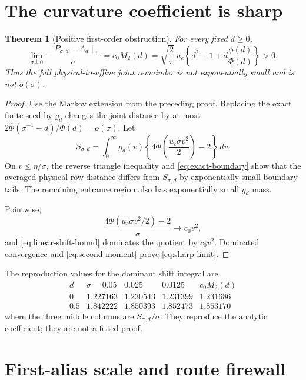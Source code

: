 \documentclass[11pt]{article}
\newtheorem{theorem}{Theorem}[section]
\theoremstyle{remark}
\begin{document}
\section{The curvature coefficient is sharp}

\begin{theorem}[Positive first-order obstruction]
\label{thm:sharp-coefficient}
For every fixed $d\ge0$,
\begin{equation}\label{eq:sharp-limit}
 \boxed{
 \lim_{\sigma\downarrow0}
 \frac{\|P_{\sigma,d}-A_d\|_1}{\sigma}
 =c_0M_2(d)
 =\sqrt{\frac2\pi}\,u_c
 \left\{d^2+1+d\frac{\phi(d)}{\Phi(d)}\right\}>0.}
\end{equation}
Thus the full physical-to-affine joint remainder is not exponentially small
and is not $o(\sigma)$.
\end{theorem}

\begin{proof}
Use the Markov extension from the preceding proof.  Replacing the exact
finite seed by $g_d$ changes the joint distance by at most
$2\overline\Phi(\sigma^{-1}-d)/\Phi(d)=o(\sigma)$.  Let
\[
 S_{\sigma,d}=\int_0^\infty g_d(v)
 \left\{4\Phi\!\left(\frac{u_c\sigma v^2}{2}\right)-2\right\}\,dv.
\]
On $v\le\eta/\sigma$, the reverse triangle inequality and
\eqref{eq:exact-boundary} show that the averaged physical row distance
differs from $S_{\sigma,d}$ by exponentially small boundary tails.  The
remaining entrance region also has exponentially small $g_d$ mass.

Pointwise,
\[
 \frac{4\Phi(u_c\sigma v^2/2)-2}{\sigma}
 \longrightarrow c_0v^2,
\]
and \eqref{eq:linear-shift-bound} dominates the quotient by $c_0v^2$.
Dominated convergence and \eqref{eq:second-moment} prove
\eqref{eq:sharp-limit}.
\end{proof}

The reproduction values for the dominant shift integral are
\[
\begin{array}{c|ccc|c}
d & \sigma=0.05 & 0.025 & 0.0125 & c_0M_2(d)\\ \hline
0   &1.227163&1.230543&1.231399&1.231686\\
0.5 &1.842222&1.850393&1.852473&1.853170
\end{array}
\]
where the three middle columns are $S_{\sigma,d}/\sigma$.  They reproduce
the analytic coefficient; they are not a fitted proof.

\section{First-alias scale and route firewall}
\end{document}
